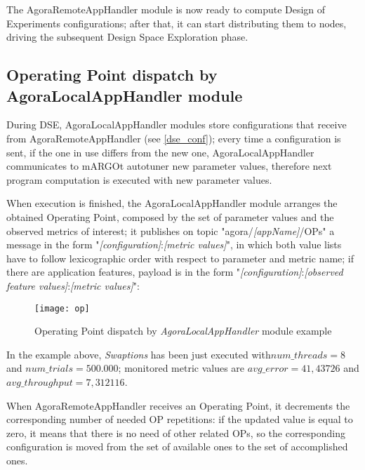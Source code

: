 The AgoraRemoteAppHandler module is now ready to compute Design of Experiments configurations; after that, it can start distributing them to nodes, driving the subsequent Design Space Exploration phase.





\subsection{Operating Point dispatch by AgoraLocalAppHandler module}\label{opSend}

During DSE, AgoraLocalAppHandler modules store configurations that receive from AgoraRemoteAppHandler (see \ref{dse_conf}); every time a configuration is sent, if the one in use differs from the new one, AgoraLocalAppHandler communicates to mARGOt autotuner new parameter values, therefore next program computation is executed with new parameter values.

When execution is finished, the AgoraLocalAppHandler module arranges the obtained Operating Point, composed by the set of parameter values and the observed metrics of interest; it publishes on topic "agora/\textit{[appName]}/OPs" a message in the form "\textit{[configuration]}:\textit{[metric values]}", in which both value lists have to follow lexicographic order with respect to parameter and metric name; if there are application features, payload is in the form "\textit{[configuration]}:\textit{[ob\-served feature values]}:\textit{[metric values]}":

\begin{figure}[H]

    \centering
    \texttt{[image: op]}
    \caption{Operating Point dispatch by \textit{AgoraLocalAppHandler} module example}
    \label{fig:op}
    
\end{figure}

In the example above, \textit{Swaptions} has been just executed with\linebreak $num\_threads = 8$ and $num\_trials = 500.000$; monitored metric values are $avg\_error = 41,43726$ and $avg\_throughput = 7,312116$.

When AgoraRemoteAppHandler receives an Operating Point, it decrements the corresponding number of needed OP repetitions: if the updated value is equal to zero, it means that there is no need of other related OPs, so the corresponding configuration is moved from the set of available ones to the set of accomplished ones.

